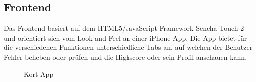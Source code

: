 \subsection*{Frontend}
Das Frontend basiert auf dem HTML5/JavaScript Framework Sencha Touch 2 und orientiert sich vom Look and Feel an einer iPhone-App.
Die App bietet für die verschiedenen Funktionen unterschiedliche Tabs an, auf welchen der Benutzer Fehler beheben oder prüfen und die Highscore oder sein Profil anschauen kann.

\begin{figure}[H]
\hfill
{}
\hfill
{}
\caption{Kort App}
\label{image-kort-screenshots}
\end{figure}

